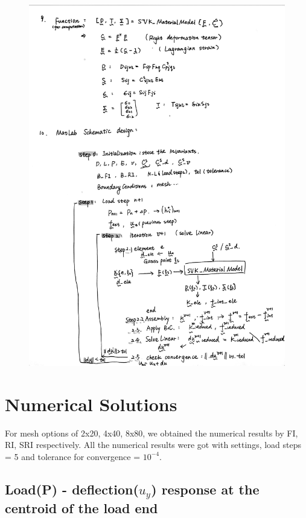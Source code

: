 \documentclass{article}
\begin{document}
\begin{figure}[H]
	\centering
	\includegraphics[scale=0.23]{MAE232C_FINAL_PROJECT_latex/formulation_3.jpg}
\end{figure}

\vspace*{1.5em}


\section{Numerical Solutions}
\vspace*{0.5em}
For mesh options of 2x20, 4x40, 8x80, we obtained the numerical results by FI, RI, SRI respectively. All the numerical results were got with settings, load steps = 5 and tolerance for convergence = $10^{-4}$.

\vspace*{0.5em}
\subsection{Load(P) - deflection($u_y$) response at the centroid of the load end}
\vspace*{0.5em}
\end{document}
